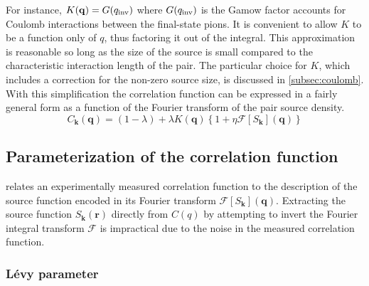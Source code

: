 For instance, $K(\mathbf{q}) = G(q_{\mathrm{inv}})$ where $G(q_{\mathrm{inv}})$ is the Gamow factor accounts for Coulomb interactions between the final-state pions.
It is convenient to allow $K$ to be a function only of $q$, thus factoring it out of the integral.
This approximation is reasonable so long as the size of the source is small compared to the characteristic interaction length of the pair.
The particular choice for $K$, which includes a correction for the non-zero source size, is discussed in \cref{subsec:coulomb}.
With this simplification the correlation function can be expressed in a fairly general form as a function of the Fourier transform of the pair source density.
\begin{equation}
  \label{eq:correlation_function}
  C_\mathbf{k}(\mathbf{q}) = (1-\lambda) + \lambda K(\mathbf{q})\left\{ 1 + \eta \mathcal{F} \left[ S_\mathbf{k} \right](\mathbf{q}) \right\}
\end{equation}


\subsection{Parameterization of the correlation function}
 relates an experimentally measured correlation function to the description of the source function encoded in its Fourier transform $\mathcal{F}[S_\mathbf{k}](\mathbf{q})$.
Extracting the source function $S_\mathbf{k}(\mathbf{r})$ directly from $C(q)$ by attempting to invert the Fourier integral transform $\mathcal{F}$ is impractical due to the noise in the measured correlation function.

\subsubsection{L\'evy parameter}


